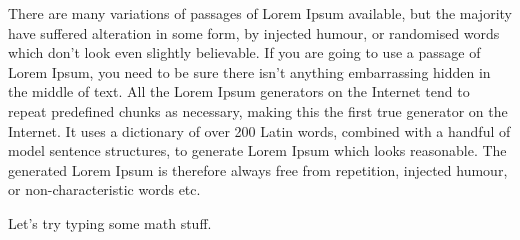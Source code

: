 \documentclass{scrartcl}
\begin{document}
There are many variations of passages of Lorem Ipsum available, but the majority have suffered alteration in some form, by injected humour, or randomised words which don't look even slightly believable. If you are going to use a passage of Lorem Ipsum, you need to be sure there isn't anything embarrassing hidden in the middle of text. All the Lorem Ipsum generators on the Internet tend to repeat predefined chunks as necessary, making this the first true generator on the Internet. It uses a dictionary of over 200 Latin words, combined with a handful of model sentence structures, to generate Lorem Ipsum which looks reasonable. The generated Lorem Ipsum is therefore always free from repetition, injected humour, or non-characteristic words etc.

Let's try typing some math stuff. \classname


\newpage
\end{document}
